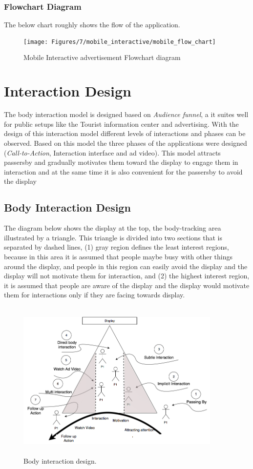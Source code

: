 \subsubsection{Flowchart Diagram}
The below chart roughly shows the flow of the application.
\begin{figure}[H]
    \centering
    \texttt{[image: Figures/7/mobile\_interactive/mobile\_flow\_chart]}
    \caption{Mobile Interactive advertisement Flowchart diagram}%
    \label{fig:mobile_flowchat}%
\end{figure}
\fi

\section{Interaction Design}
The body interaction model is designed based on \emph{Audience funnel},  a it suites well for public setups like the Tourist information center and advertising. With the design of this interaction model different levels of interactions and phases can be observed. Based on this model the three phases of the applications were designed (\emph{Call-to-Action}, Interaction interface and ad video). This model attracts passersby and gradually motivates them toward the display to engage them in interaction and at the same time it is also convenient for the passersby to avoid the display


\subsection{Body Interaction Design}
The diagram below shows the display at the top, the body-tracking area illustrated by a triangle. This triangle is divided into two sections that is separated by dashed lines, (1) gray region defines the least interest regions, because in this area it is assumed that people maybe busy with other things around the display, and people in this region can easily avoid the display and the display will not motivate them for interaction, and (2) the highest interest region, it is assumed that people are aware of the display and the display would motivate them for interactions only if they are facing towards display.


\begin{figure}[H]
    \centering
    \includegraphics[width=0.9\textwidth,height=8cm]{Figures/7/body_interaction_model}
    \caption{Body interaction design.}%
    \label{fig:body_interaction_deisng}%
\end{figure}


